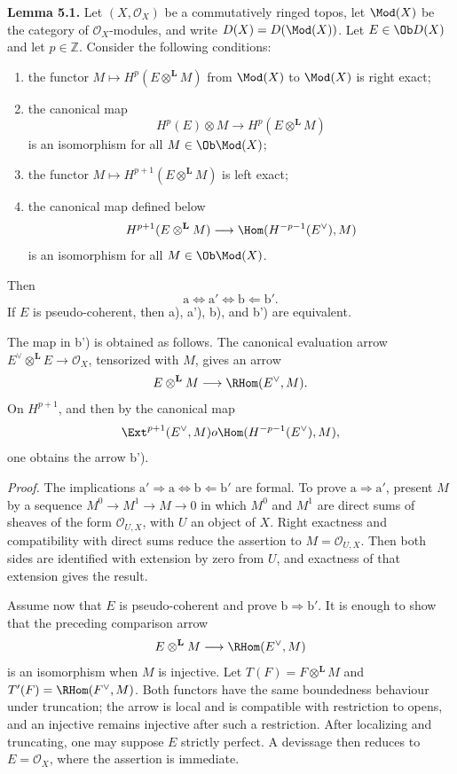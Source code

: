 \textbf{Lemma 5.1.} Let \((X,\mathcal O_X)\) be a commutatively ringed topos, let \(\Mod(X)\) be the category of \(\mathcal O_X\)-modules, and write \(D(X)=D(\Mod(X))\). Let \(E\in\Ob D(X)\) and let \(p\in\mathbb Z\). Consider the following conditions:
\begin{enumerate}[label=\alph*)]
\item the functor \(M\mapsto H^p(E\otimes^{\mathbf L}M)\) from \(\Mod(X)\) to \(\Mod(X)\) is right exact;
\item[\(\mathrm a'\)] the canonical map
\[
 H^p(E)\otimes M\longrightarrow H^p(E\otimes^{\mathbf L}M)
\]
is an isomorphism for all \(M\in\Ob\Mod(X)\);
\item[\(\mathrm b\)] the functor \(M\mapsto H^{p+1}(E\otimes^{\mathbf L}M)\) is left exact;
\item[\(\mathrm b'\)] the canonical map defined below
\[
 H^{p+1}(E\otimes^{\mathbf L}M)
 \longrightarrow
 \Hom(H^{-p-1}(E^{\vee}),M)
\]
is an isomorphism for all \(M\in\Ob\Mod(X)\).
\end{enumerate}
Then
\[
 \mathrm a\Longleftrightarrow \mathrm a'
 \Longleftrightarrow \mathrm b
 \Longleftarrow \mathrm b'.
\]
If \(E\) is pseudo-coherent, then a), a'), b), and b') are equivalent.

The map in b') is obtained as follows. The canonical evaluation arrow \(E^{\vee}\otimes^{\mathbf L}E\to\mathcal O_X\), tensorized with \(M\), gives an arrow
\[
 E\otimes^{\mathbf L}M\longrightarrow\RHom(E^{\vee},M).
\]
On \(H^{p+1}\), and then by the canonical map
\[
 \Ext^{p+1}(E^{\vee},M)	o\Hom(H^{-p-1}(E^{\vee}),M),
\]
one obtains the arrow b').

\emph{Proof.} The implications \(\mathrm a'\Rightarrow\mathrm a\Leftrightarrow\mathrm b\Leftarrow\mathrm b'\) are formal. To prove \(\mathrm a\Rightarrow\mathrm a'\), present \(M\) by a sequence \(M^0\to M^1\to M\to0\) in which \(M^0\) and \(M^1\) are direct sums of sheaves of the form \(\mathcal O_{U,X}\), with \(U\) an object of \(X\). Right exactness and compatibility with direct sums reduce the assertion to \(M=\mathcal O_{U,X}\). Then both sides are identified with extension by zero from \(U\), and exactness of that extension gives the result.

Assume now that \(E\) is pseudo-coherent and prove \(\mathrm b\Rightarrow\mathrm b'\). It is enough to show that the preceding comparison arrow
\[
 E\otimes^{\mathbf L}M\longrightarrow\RHom(E^{\vee},M)
\]
is an isomorphism when \(M\) is injective. Let \(T(F)=F\otimes^{\mathbf L}M\) and \(T'(F)=\RHom(F^{\vee},M)\). Both functors have the same boundedness behaviour under truncation; the arrow is local and is compatible with restriction to opens, and an injective remains injective after such a restriction. After localizing and truncating, one may suppose \(E\) strictly perfect. A devissage then reduces to \(E=\mathcal O_X\), where the assertion is immediate.

